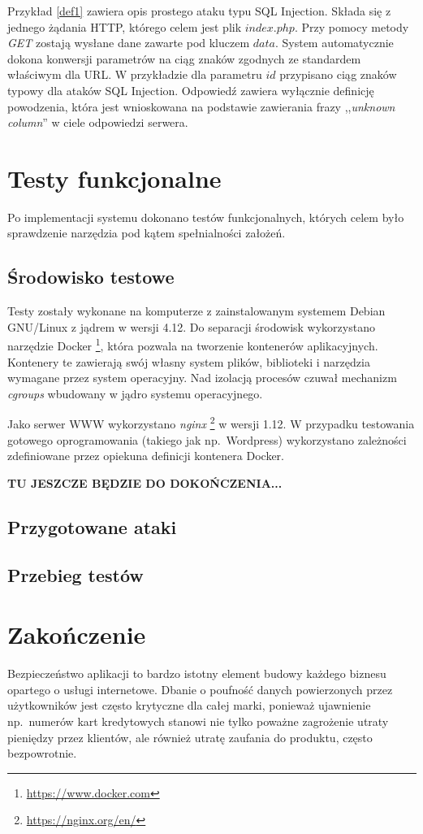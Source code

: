 \documentclass[11pt,a4paper,polish,thesis]{dcsbook}
\begin{document}
Przykład \ref{def1} zawiera opis prostego ataku typu SQL Injection. Składa się z jednego żądania HTTP, którego celem jest plik $index.php$. Przy pomocy metody \textit{GET} zostają wysłane dane zawarte pod kluczem $data$. System automatycznie dokona konwersji parametrów na ciąg znaków zgodnych ze standardem właściwym dla URL. W przykładzie dla parametru $id$ przypisano ciąg znaków typowy dla ataków SQL Injection.
Odpowiedź zawiera wyłącznie definicję powodzenia, która jest wnioskowana na podstawie zawierania frazy ,,\textit{unknown column}'' w ciele odpowiedzi serwera.


\chapter{Testy funkcjonalne}
Po implementacji systemu dokonano testów funkcjonalnych, których celem było sprawdzenie narzędzia pod kątem spełnialności założeń. 

\section{Środowisko testowe}
Testy zostały wykonane na komputerze z zainstalowanym systemem Debian GNU/Linux z jądrem w wersji 4.12. Do separacji środowisk wykorzystano narzędzie Docker \footnote{\url{https://www.docker.com}}, która pozwala na tworzenie kontenerów aplikacyjnych. Kontenery te zawierają swój własny system plików, biblioteki i narzędzia wymagane przez system operacyjny. Nad izolacją procesów czuwał mechanizm \textit{cgroups} wbudowany w jądro systemu operacyjnego.

Jako serwer WWW wykorzystano \textit{nginx} \footnote{\url{https://nginx.org/en/}} w wersji 1.12. W przypadku testowania gotowego oprogramowania (takiego jak np.~Wordpress) wykorzystano zależności zdefiniowane przez opiekuna definicji kontenera Docker.

\textbf{TU JESZCZE BĘDZIE DO DOKOŃCZENIA...}
\section{Przygotowane ataki}

\section{Przebieg testów}


\chapter{Zakończenie}
Bezpieczeństwo aplikacji to bardzo istotny element budowy każdego biznesu opartego o usługi internetowe. Dbanie o poufność danych powierzonych przez użytkowników jest często krytyczne dla całej marki, ponieważ ujawnienie np.~numerów kart kredytowych stanowi nie tylko poważne zagrożenie utraty pieniędzy przez klientów, ale również utratę zaufania do produktu, często bezpowrotnie.
\end{document}
